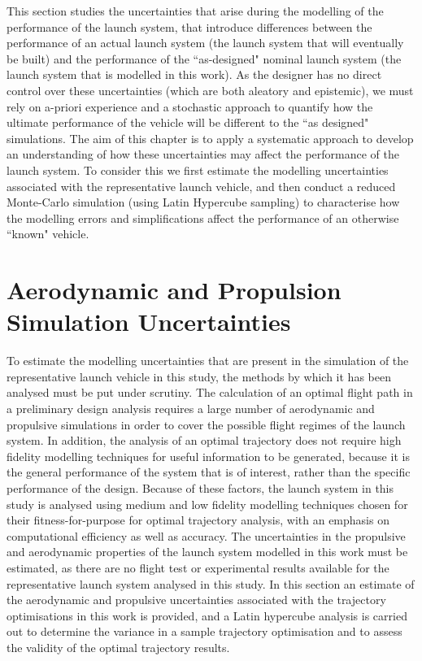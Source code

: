 This section studies the uncertainties that arise during the modelling of the performance of the launch system, that introduce differences between the performance of an actual launch system (the launch system that will eventually be built) and the performance of the ``as-designed" nominal launch system (the launch system that is modelled in this work). 
As the designer has no direct control over these uncertainties (which are both aleatory and epistemic), we must rely on a-priori experience and a stochastic approach to quantify how the ultimate performance of the vehicle will be different to the ``as designed" simulations. The aim of this chapter is to apply a systematic approach to develop an understanding of how these uncertainties may affect the performance of the launch system. To consider this we first estimate the modelling uncertainties associated with the representative launch vehicle, and then conduct a reduced Monte-Carlo simulation (using Latin Hypercube sampling) to characterise how the modelling errors and simplifications affect the performance of an otherwise ``known" vehicle.




\section{Aerodynamic and Propulsion Simulation Uncertainties}\label{sec:aerounc}

To estimate the modelling uncertainties that are present in the simulation of the representative launch vehicle in this study, the methods by which it has been analysed must be put under scrutiny. 
The calculation of an optimal flight path in a preliminary design analysis requires a large number of aerodynamic and propulsive simulations in order to cover the possible flight regimes of the launch system. In addition, the analysis of an optimal trajectory does not require high fidelity modelling techniques for useful information to be generated, because it is the general performance of the system that is of interest, rather than the specific performance of the design. Because of these factors, the launch system in this study is analysed using medium and low fidelity modelling techniques chosen for their fitness-for-purpose for optimal trajectory analysis, with an emphasis on computational efficiency as well as accuracy.
The uncertainties in the propulsive and aerodynamic properties of the launch system modelled in this work must be estimated, as there are no flight test or experimental results available for the representative launch system analysed in this study. In this section an estimate of the aerodynamic and propulsive uncertainties associated with the trajectory optimisations in this work is provided, and a Latin hypercube analysis is carried out to determine the variance in a sample trajectory optimisation and to assess the validity of the optimal trajectory results. 

